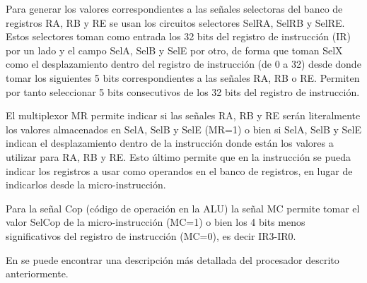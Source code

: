 Para generar los valores correspondientes a las señales selectoras del banco de registros RA, RB y RE se usan los circuitos selectores SelRA, SelRB y SelRE. Estos selectores toman como entrada los 32 bits del registro de instrucción (IR) por un lado y el campo SelA, SelB y SelE por otro, de forma que toman SelX como el desplazamiento dentro del registro de instrucción (de 0 a 32) desde donde tomar los siguientes 5 bits correspondientes a las señales RA, RB o RE. Permiten por tanto seleccionar 5 bits consecutivos de los 32 bits del registro de instrucción.

El multiplexor MR permite indicar si las señales RA, RB y RE serán literalmente los valores almacenados en SelA, SelB y SelE (MR=1) o bien si SelA, SelB y SelE indican el desplazamiento dentro de la instrucción donde están los valores a utilizar para RA, RB y RE. Esto último permite que en la instrucción se pueda indicar los registros a usar como operandos en el banco de registros, en lugar de indicarlos desde la micro-instrucción.

Para la señal Cop (código de operación en la ALU) la señal MC permite tomar el valor SelCop de la micro-instrucción (MC=1) o bien los 4 bits menos significativos del registro de instrucción (MC=0), es decir IR3-IR0.

En \cite{perez2015problemas} se puede encontrar una descripción más detallada del procesador descrito anteriormente.





